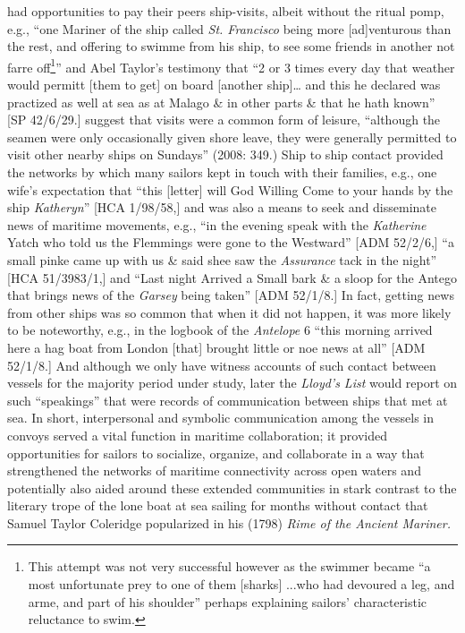 had opportunities to pay their peers ship-visits, albeit without the ritual pomp, e.g., “one Mariner of the ship called \textit{St. Francisco} being more [ad]venturous than the rest, and offering to swimme from his ship, to see some friends in another not farre off\footnote{This attempt was not very successful however as the swimmer became “a most unfortunate prey to one of them [sharks] ...who had devoured a leg, and arme, and part of his shoulder” \citep[21]{Gage1648} perhaps explaining sailors’ characteristic reluctance to swim.}” \citep[21,]{Gage1648} and Abel Taylor’s testimony that “2 or 3 times every day that weather would permitt [them to get] on board [another ship]… and this he declared was practized as well at sea as at Malago \& in other parts \& that he hath known” [SP 42/6/29.] \citeauthor{AdkinsAdkins2008} suggest that  visits were a common form of leisure, “although the seamen were only occasionally given shore leave, they were generally permitted to visit other nearby ships on Sundays” (2008: 349.) Ship to ship contact provided the networks by which many sailors kept in touch with their families, e.g., one wife’s expectation that “this [letter] will God Willing Come to your hands by the ship \textit{Katheryn}” [HCA 1/98/58,] and was also a means to seek and disseminate news of maritime movements, e.g., “in the evening speak with the \textit{Katherine} Yatch who told us the Flemmings were gone to the Westward” [ADM 52/2/6,] “a small pinke came up with us \& said shee saw the \textit{Assurance} tack in the night” [HCA 51/3983/1,] and “Last night Arrived a Small bark \& a sloop for the Antego that brings news of the \textit{Garsey} being taken” [ADM 52/1/8.] In fact, getting news from other ships was so common that when it did not happen, it was more likely to be noteworthy, e.g., in the logbook of the \textit{Antelope} 6 \citealt{March1691} “this morning arrived here a hag boat from London [that] brought little or noe news at all” [ADM 52/1/8.] And although we only have witness accounts of such contact between vessels for the majority period under study, later the \textit{Lloyd's List} would report on such “speakings” that were records of communication between ships that met at sea. In short, interpersonal and symbolic communication among the vessels in convoys served a vital function in maritime collaboration; it provided opportunities for sailors to socialize, organize, and collaborate in a way that strengthened the networks of maritime connectivity across open waters and potentially also aided  around these extended communities in stark contrast to the literary trope of the lone boat at sea sailing for months without contact that Samuel Taylor Coleridge popularized in his (1798) \textit{Rime of the \MakeUppercase{A}}\textit{ncient Mariner.} 

